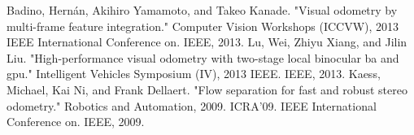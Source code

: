 \documentclass{article}
\begin{document}
\begin{thebibliography}{9}
Badino, Hernán, Akihiro Yamamoto, and Takeo Kanade. "Visual odometry by multi-frame feature integration." Computer Vision Workshops (ICCVW), 2013 IEEE International Conference on. IEEE, 2013.
Lu, Wei, Zhiyu Xiang, and Jilin Liu. "High-performance visual odometry with two-stage local binocular ba and gpu." Intelligent Vehicles Symposium (IV), 2013 IEEE. IEEE, 2013.
Kaess, Michael, Kai Ni, and Frank Dellaert. "Flow separation for fast and robust stereo odometry." Robotics and Automation, 2009. ICRA'09. IEEE International Conference on. IEEE, 2009.
\end{thebibliography}
\end{document}
